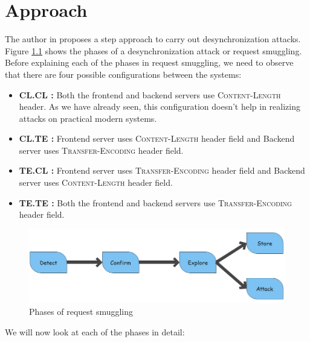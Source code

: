 \chapter{Approach}
The author in \cite{b6} proposes a step approach to carry out desynchronization attacks. Figure \ref{fig:Phases} shows the phases of a desynchronization attack or request smuggling. Before explaining each of the phases in request smuggling, we need to observe that there are four possible configurations between the systems:
\begin{itemize}
	\item \textbf{CL.CL : } Both the frontend and backend servers use \textsc{Content-Length} header. As we have already seen, this configuration doesn't help in realizing attacks on practical modern systems. 
	\item \textbf{CL.TE : } Frontend server uses \textsc{Content-Length} header field and Backend server uses \textsc{Transfer-Encoding} header field. 
	\item \textbf{TE.CL : } Frontend server uses \textsc{Transfer-Encoding} header field and Backend server uses \textsc{Content-Length} header field.
	\item \textbf{TE.TE : } Both the frontend and backend servers use \textsc{Transfer-Encoding} header field.
\end{itemize}
\begin{figure}
	\includegraphics[width=14cm]{images/Phases}
	\caption{Phases of request smuggling}
	\label{fig:Phases}
\end{figure}
We will now look at each of the phases in detail:
